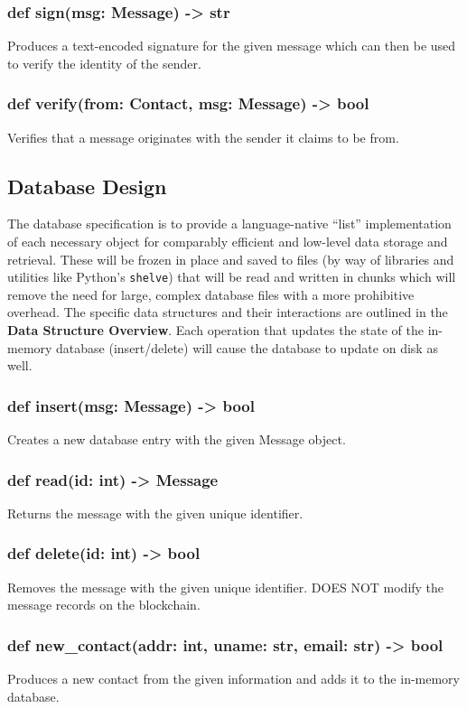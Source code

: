 \documentclass[titlepage]{report}
\begin{document}
\subsubsection{def sign(msg: Message) -> str}
Produces a text-encoded signature for the given message which can then be used to verify the identity of the sender.
\subsubsection{def verify(from: Contact, msg: Message) -> bool}
Verifies that a message originates with the sender it claims to be from.

\subsection{Database Design}
The database specification is to provide a language-native ``list'' implementation of each necessary object for comparably efficient and low-level data storage and retrieval. These will be frozen in place and saved to files (by way of libraries and utilities like Python's \texttt{shelve}) that will be read and written in chunks which will remove the need for large, complex database files with a more prohibitive overhead. The specific data structures and their interactions are outlined in the \textbf{Data Structure Overview}. Each operation that updates the state of the in-memory database (insert/delete) will cause the database to update on disk as well.

\subsubsection{def insert(msg: Message) -> bool}
Creates a new database entry with the given Message object.
\subsubsection{def read(id: int) -> Message}
Returns the message with the given unique identifier.
\subsubsection{def delete(id: int) -> bool}
Removes the message with the given unique identifier. DOES NOT modify the message records on the \gls{blockchain}.
\subsubsection{def new\_contact(addr: int, uname: str, email: str) -> bool}
Produces a new contact from the given information and adds it to the in-memory database.
\end{document}
